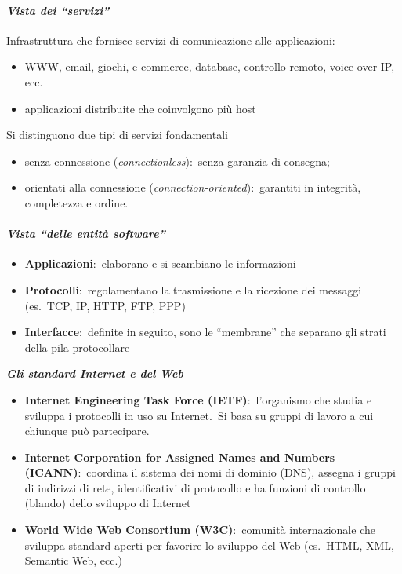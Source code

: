 \paragraph{\emph{Vista dei ``servizi''}}

Infrastruttura che fornisce servizi di comunicazione alle applicazioni:\
\begin{itemize}
    \item WWW, email, giochi, e-commerce, database, controllo remoto, voice over IP, ecc.
    \item applicazioni distribuite che coinvolgono più host
\end{itemize}
Si distinguono due tipi di servizi fondamentali
\begin{itemize}
    \item senza connessione (\emph{connectionless}):\ senza garanzia di consegna;
    \item orientati alla connessione (\emph{connection-oriented}):\ garantiti in integrità, completezza e ordine.
\end{itemize}

\paragraph{\emph{Vista ``delle entità software''}}

\begin{itemize}
    \item \textbf{Applicazioni}:\ elaborano e si scambiano le informazioni
    \item \textbf{Protocolli}:\ regolamentano la trasmissione e la ricezione dei messaggi (es.\ TCP, IP, HTTP, FTP, PPP)
    \item \textbf{Interfacce}:\ definite in seguito, sono le ``membrane'' che separano gli strati della pila protocollare
\end{itemize}
\textbf{\emph{Gli standard Internet e del Web}}
\begin{itemize}
    \item \textbf{Internet Engineering Task Force (IETF)}:\ l'organismo che studia e sviluppa i protocolli in uso su Internet.\ Si basa su gruppi di lavoro a cui chiunque può partecipare.
    \item \textbf{Internet Corporation for Assigned Names and Numbers (IC\-ANN)}:\ coordina il sistema dei nomi di dominio (DNS), assegna i gruppi di indirizzi di rete, identificativi di protocollo e ha funzioni di controllo (blando) dello sviluppo di Internet
    \item \textbf{World Wide Web Consortium (W3C)}:\ comunità internazionale che sviluppa standard aperti per favorire lo sviluppo del Web (es.\ HTML, XML, Semantic Web, ecc.)
\end{itemize}

